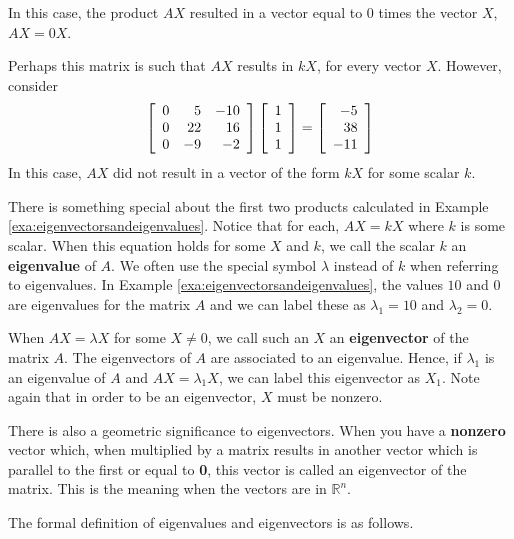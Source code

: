\begin{solution}
In this case, the product $AX$ resulted in a vector equal to $0$ times the vector $X$, $AX=0X$. 

Perhaps this matrix is such that $AX$ results in $kX$, for every vector $X$. However, consider
\begin{equation*}
\left[
\begin{array}{rrr}
0 & 5 & -10 \\
0 & 22 & 16 \\
0 & -9 & -2
\end{array}
\right] \left[
\begin{array}{r}
1 \\
1 \\
1
\end{array}
\right] = \left[
\begin{array}{r}
-5 \\
38 \\
-11
\end{array}
\right] 
\end{equation*}
In this case, $AX$ did not result in a vector of the form $kX$ for some scalar $k$. 
\end{solution}

There is something special about the first two products calculated in
Example \ref{exa:eigenvectorsandeigenvalues}.  Notice that for each,
$AX=kX$ where $k$ is some scalar.  When this equation holds for some
$X$ and $k$, we call the scalar $k$ an \textbf{eigenvalue} of $A$. We
often use the special symbol $\lambda$ instead of $k$ when referring
to eigenvalues. In Example \ref{exa:eigenvectorsandeigenvalues}, the
values $10$ and $0$ are eigenvalues for the matrix $A$ and we can
label these as $\lambda_1 = 10$ and $\lambda_2 = 0$.

When $AX = \lambda X$ for some $X \neq 0$, we call such an $X$ an
\textbf{eigenvector} of the matrix $A$. The eigenvectors of $A$ are
associated to an eigenvalue.  Hence, if $\lambda_1$ is an eigenvalue
of $A$ and $AX = \lambda_1 X$, we can label this eigenvector as
$X_1$. Note again that in order to be an eigenvector, $X$ must be
nonzero.

There is also a geometric significance to eigenvectors.  When you have a \textbf{nonzero} vector which, when multiplied by a matrix results in another vector
which is parallel to the first or equal to \textbf{0}, this vector is called
an eigenvector of the matrix. This is the meaning when the vectors are in 
$\mathbb{R}^{n}.$ 

The formal definition of eigenvalues and eigenvectors is as follows.

